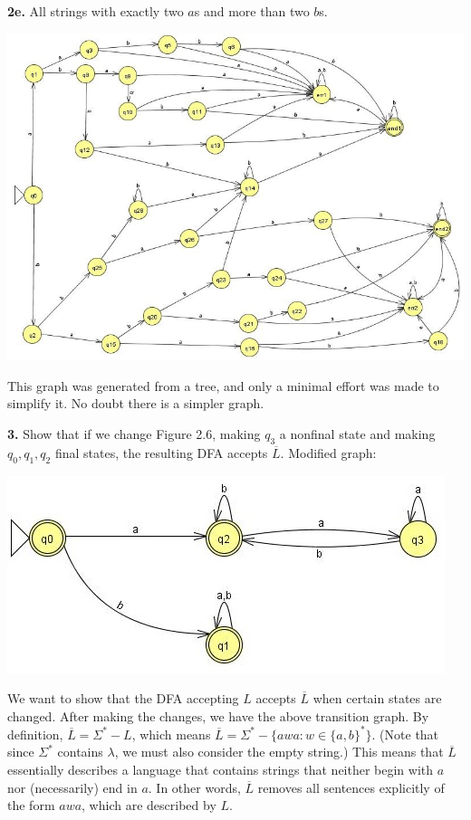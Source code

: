 \documentclass[12pt,letter]{article}
\begin{document}
\pagebreak

\textbf{2e.} All strings with exactly two $a$s and more than two $b$s.\\
\begin{center}
	\includegraphics[scale=0.80]{"images/Lab 1 - 2e"}
\end{center}
This graph was generated from a tree, and only a minimal effort was made to simplify it. No doubt there is a simpler graph.

\textbf{3.} Show that if we change Figure 2.6, making $q_3$ a nonfinal state and making $q_0, q_1, q_2$ final states, the resulting DFA accepts $\overline{L}$. Modified graph:\\
\begin{center}
	\includegraphics{"images/Lab 1 - 3"}
\end{center}

We want to show that the DFA accepting $L$ accepts $\overline{L}$ when certain states are changed. After making the changes, we have the above transition graph. By definition, $\overline{L} = \Sigma^{*} - L$, which means $\overline{L} = \Sigma^{*} - \lbrace awa : w \in \lbrace a,b \rbrace^{*} \rbrace$. (Note that since $\Sigma^{*}$ contains $\lambda$, we must also consider the empty string.) This means that $\overline{L}$ essentially describes a language that contains strings that neither begin with $a$ nor (necessarily) end in $a$. In other words, $\overline{L}$ removes all sentences explicitly of the form $awa$, which are described by $L$. 
\end{document}
